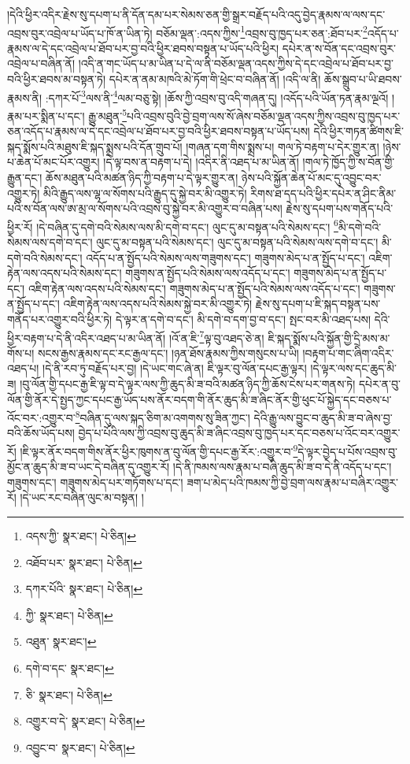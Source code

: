།དེའི་ཕྱིར་འདིར་རྗེས་སུ་དཔག་པ་ནི་དོན་དམ་པར་སེམས་ཅན་གྱི་སྒྲར་བརྗོད་པའི་འདུ་བྱེད་རྣམས་ལ་ལས་དང་འབྲས་བུར་འབྲེལ་པ་ཡོད་པ་ཁོ་ན་ཡིན་ཏེ། བཅོམ་ལྡན་:འདས་ཀྱིས་\footnote{འདས་ཀྱི་  སྣར་ཐང་།  པེ་ཅིན། }འབྲས་བུ་ཁྱད་པར་ཅན་:ཐོབ་པར་\footnote{འཐོབ་པར་  སྣར་ཐང་།  པེ་ཅིན། }འདོད་པ་རྣམས་ལ་དེ་དང་འབྲེལ་པ་ཐོབ་པར་བྱ་བའི་ཕྱིར་ཐབས་བསྟན་པ་ཡོད་པའི་ཕྱིར། དཔེར་ན་ས་བོན་དང་འབྲས་བུར་འབྲེལ་པ་བཞིན་ནོ། །འདི་ན་གང་ཡོད་པ་མ་ཡིན་པ་དེ་ལ་ནི་བཅོམ་ལྡན་འདས་ཀྱིས་དེ་དང་འབྲེལ་པ་ཐོབ་པར་བྱ་བའི་ཕྱིར་ཐབས་མ་བསྟན་ཏེ། དཔེར་ན་ནམ་མཁའི་མེ་ཏོག་གི་ཕྲེང་བ་བཞིན་ནོ། །འདི་ལ་ནི། ཆོས་སྒྲུབ་པ་ཡི་ཐབས་རྣམས་ནི། :དཀར་པོ་\footnote{དཀར་པོའི་  སྣར་ཐང་།  པེ་ཅིན། }ལས་ནི་\footnote{ཀྱི་  སྣར་ཐང་།  པེ་ཅིན། }ལམ་བཅུ་སྟེ། །ཆོས་ཀྱི་འབྲས་བུ་འདི་གཞན་དུ། །འདོད་པའི་ཡོན་ཏན་རྣམ་ལྔའོ། །རྣམ་པར་སྨིན་པ་དང་། རྒྱུ་མཐུན་\footnote{འཐུན་  སྣར་ཐང་། }པའི་འབྲས་བུའི་བྱེ་བྲག་ལས་སོ་ཞེས་བཅོམ་ལྡན་འདས་ཀྱིས་འབྲས་བུ་ཁྱད་པར་ཅན་འདོད་པ་རྣམས་ལ་དེ་དང་འབྲེལ་པ་ཐོབ་པར་བྱ་བའི་ཕྱིར་ཐབས་བསྟན་པ་ཡོད་པས། དེའི་ཕྱིར་གཏན་ཚིགས་ཇི་སྐད་སྨོས་པའི་མཐུས་ཇི་སྐད་སྨྲས་པའི་དོན་གྲུབ་པོ། །གཞན་དག་གིས་སྨྲས་པ། གལ་ཏེ་བརྟག་པ་དེར་གྱུར་ན། །ཉེས་པ་ཆེན་པོ་མང་པོར་འགྱུར། །དེ་ལྟ་བས་ན་བརྟག་པ་དེ། །འདིར་ནི་འཐད་པ་མ་ཡིན་ནོ། །གལ་ཏེ་ཁྱོད་ཀྱི་ས་བོན་གྱི་རྒྱུན་དང་། ཆོས་མཐུན་པའི་མཚན་ཉིད་ཀྱི་བརྟག་པ་དེ་ལྟར་གྱུར་ན། ཉེས་པའི་སྐྱོན་ཆེན་པོ་མང་དུ་འབྱུང་བར་འགྱུར་ཏེ། མིའི་རྒྱུད་ལས་ལྷ་ལ་སོགས་པའི་རྒྱུད་དུ་སྐྱེ་བར་མི་འགྱུར་ཏེ། རིགས་ཐ་དད་པའི་ཕྱིར་དཔེར་ན་ཤིང་ནིམ་པའི་ས་བོན་ལས་ཨ་མྲ་ལ་སོགས་པའི་འབྲས་བུ་སྐྱེ་བར་མི་འགྱུར་བ་བཞིན་པས། རྗེས་སུ་དཔག་པས་གནོད་པའི་ཕྱིར་རོ། །དེ་བཞིན་དུ་དགེ་བའི་སེམས་ལས་མི་དགེ་བ་དང་། ལུང་དུ་མ་བསྟན་པའི་སེམས་དང་། \footnote{དགེ་བ་དང་  སྣར་ཐང་། }མི་དགེ་བའི་སེམས་ལས་དགེ་བ་དང་། ལུང་དུ་མ་བསྟན་པའི་སེམས་དང་། ལུང་དུ་མ་བསྟན་པའི་སེམས་ལས་དགེ་བ་དང་། མི་དགེ་བའི་སེམས་དང་། འདོད་པ་ན་སྤྱོད་པའི་སེམས་ལས་གཟུགས་དང་། གཟུགས་མེད་པ་ན་སྤྱོད་པ་དང་། འཇིག་རྟེན་ལས་འདས་པའི་སེམས་དང་། གཟུགས་ན་སྤྱོད་པའི་སེམས་ལས་འདོད་པ་དང་། གཟུགས་མེད་པ་ན་སྤྱོད་པ་དང་། འཇིག་རྟེན་ལས་འདས་པའི་སེམས་དང་། གཟུགས་མེད་པ་ན་སྤྱོད་པའི་སེམས་ལས་འདོད་པ་དང་། གཟུགས་ན་སྤྱོད་པ་དང་། འཇིག་རྟེན་ལས་འདས་པའི་སེམས་སྐྱེ་བར་མི་འགྱུར་ཏེ། རྗེས་སུ་དཔག་པ་ཇི་སྐད་བསྟན་པས་གནོད་པར་འགྱུར་བའི་ཕྱིར་ཏེ། དེ་ལྟར་ན་དགེ་བ་དང་། མི་དགེ་བ་དག་བྱ་བ་དང་། སྤང་བར་མི་འཐད་པས། དེའི་ཕྱིར་བརྟག་པ་དེ་ནི་འདིར་འཐད་པ་མ་ཡིན་ནོ། །འོ་ན་ཇི་\footnote{ཅི་  སྣར་ཐང་།  པེ་ཅིན། }ལྟ་བུ་འཐད་ཅེ་ན། ཇི་སྐད་སྨོས་པའི་སྐྱོན་གྱི་དྲི་མས་མ་གོས་པ། སངས་རྒྱས་རྣམས་དང་རང་རྒྱལ་དང་། །ཉན་ཐོས་རྣམས་ཀྱིས་གསུངས་པ་ཡི། །བརྟག་པ་གང་ཞིག་འདིར་འཐད་པ། །དེ་ནི་རབ་ཏུ་བརྗོད་པར་བྱ། །དེ་ཡང་གང་ཞེ་ན། ཇི་ལྟར་བུ་ལོན་དཔང་རྒྱ་ལྟར། །དེ་ལྟར་ལས་དང་ཆུད་མི་ཟ། །བུ་ལོན་གྱི་དཔང་རྒྱ་ཇི་ལྟ་བ་དེ་ལྟར་ལས་ཀྱི་ཆུད་མི་ཟ་བའི་མཚན་ཉིད་ཀྱི་ཆོས་ངེས་པར་གནས་ཏེ། དཔེར་ན་བུ་ལོན་གྱི་ནོར་དེ་སྤྱད་ཀྱང་དཔང་རྒྱ་ཡོད་པས་ནོར་བདག་གི་ནོར་ཆུད་མི་ཟ་ཞིང་ནོར་གྱི་ཕུང་པོ་སྐྱེད་དང་བཅས་པ་འོང་བར་:འགྱུར་བ་\footnote{འགྱུར་བ་དེ་  སྣར་ཐང་།  པེ་ཅིན། }བཞིན་དུ་ལས་སྐད་ཅིག་མ་འགགས་སུ་ཟིན་ཀྱང་། དེའི་རྒྱུ་ལས་བྱུང་བ་ཆུད་མི་ཟ་བ་ཞེས་བྱ་བའི་ཆོས་ཡོད་པས། བྱེད་པ་པོའི་ལས་ཀྱི་འབྲས་བུ་ཆུད་མི་ཟ་ཞིང་འབྲས་བུ་ཁྱད་པར་དང་བཅས་པ་འོང་བར་འགྱུར་རོ། །ཇི་ལྟར་ནོར་བདག་གིས་ནོར་ཕྱིར་ཁུགས་ན་བུ་ལོན་གྱི་དཔང་རྒྱ་རོར་:འགྱུར་བ་\footnote{འབྱུང་བ་  སྣར་ཐང་།  པེ་ཅིན། }དེ་ལྟར་བྱེད་པ་པོས་འབྲས་བུ་མྱོང་ན་ཆུད་མི་ཟ་བ་ཡང་དེ་བཞིན་དུ་འགྱུར་རོ། །དེ་ནི་ཁམས་ལས་རྣམ་པ་བཞི་ཆུད་མི་ཟ་བ་དེ་ནི་འདོད་པ་དང་། གཟུགས་དང་། གཟུགས་མེད་པར་གཏོགས་པ་དང་། ཟག་པ་མེད་པའི་ཁམས་ཀྱི་བྱེ་བྲག་ལས་རྣམ་པ་བཞིར་འགྱུར་རོ། །དེ་ཡང་རང་བཞིན་ལུང་མ་བསྟན། །
